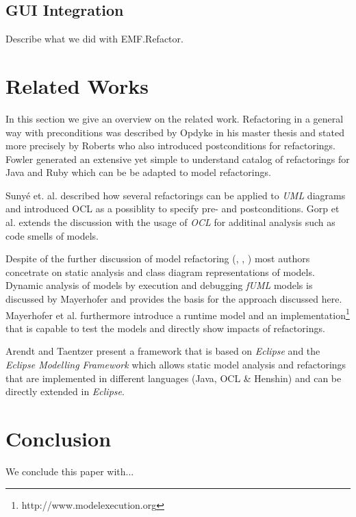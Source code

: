 \documentclass{llncs}
\begin{document}
\subsection{GUI Integration}
Describe what we did with EMF.Refactor.

\section{Related Works}

In this section we give an overview on the related work. Refactoring in a general way with preconditions was described
by Opdyke \cite{mast:REFOOF} in his master thesis and stated more precisely by Roberts \cite{rob99} who also introduced
postconditions for refactorings. Fowler \cite{fow99} generated an extensive yet simple to understand catalog of
refactorings for Java and Ruby which can be be adapted to model refactorings.


Suny{\'e} et. al. \cite{DBLP:conf/uml/SunyePTJ01} described how several refactorings can be applied to \textit{UML}
diagrams and introduced OCL as a possiblity to specify pre- and postconditions. Gorp et al. \cite{gorp03} extends the
discussion with the usage of \textit{OCL} for additinal analysis such as code smells of models.


Despite of the further discussion of model refactoring (\cite{DBLP:conf/uml/CorreaW04}, \cite{DBLP:conf/ershov/BaarM06},
\cite{DBLP:journals/ase/ArendtT13}) most authors concetrate on static analysis and class diagram representations of
models. Dynamic analysis of models by execution and debugging \textit{fUML} models is discussed by Mayerhofer
\cite{DBLP:conf/icse/Mayerhofer12} and provides the basis for the approach discussed here. Mayerhofer et al.
\cite{DBLP:conf/models/MayerhoferLK12} furthermore introduce a runtime model and an
implementation\footnote{http://www.modelexecution.org} that is capable to test the models and directly show impacts of
refactorings.


Arendt and Taentzer \cite{DBLP:journals/ase/ArendtT13} present a framework that is based on \textit{Eclipse} and the
\textit{Eclipse Modelling Framework} which allows static model analysis and refactorings that are implemented in
different languages (Java, OCL \& Henshin) and can be directly extended in \textit{Eclipse}.


\section{Conclusion}
We conclude this paper with...

\newpage


\end{document}
